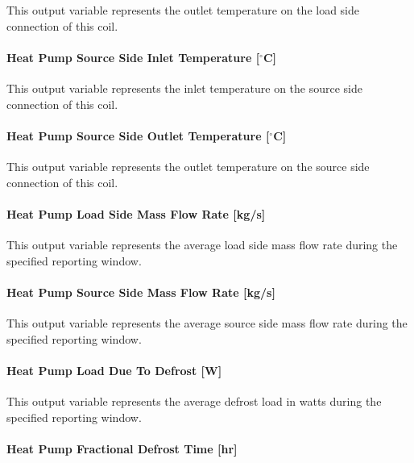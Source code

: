 This output variable represents the outlet temperature on the load side connection of this coil.

\paragraph{Heat Pump Source Side Inlet Temperature {[}$^\circ$C{]}}\label{plhp_eir_outputs_t_source_in}

This output variable represents the inlet temperature on the source side connection of this coil.

\paragraph{Heat Pump Source Side Outlet Temperature {[}$^\circ$C{]}}\label{plhp_eir_outputs_t_source_out}

This output variable represents the outlet temperature on the source side connection of this coil.

\paragraph{Heat Pump Load Side Mass Flow Rate {[}kg/s{]}}\label{plhp_eir_outputs_load_flow}

This output variable represents the average load side mass flow rate during the specified reporting window.

\paragraph{Heat Pump Source Side Mass Flow Rate {[}kg/s{]}}\label{plhp_eir_outputs_src_flow}

This output variable represents the average source side mass flow rate during the specified reporting window.

\paragraph{Heat Pump Load Due To Defrost {[}W{]}}\label{plhp_eir_outputs_load_due_to_defrost}

This output variable represents the average defrost load in watts during the specified reporting window.

\paragraph{Heat Pump Fractional Defrost Time {[}hr{]}}\label{plhp_eir_outputs_fractional_defrost_time}

